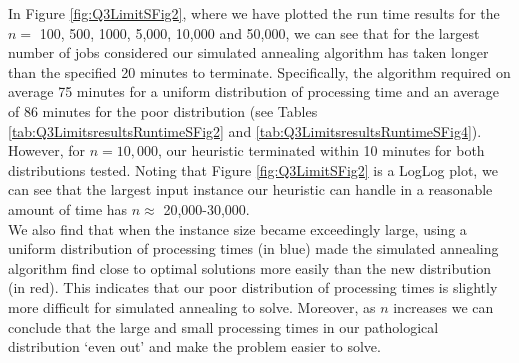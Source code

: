 \documentclass[12pt,a4paper,reqno]{article}
\begin{document}
In Figure \ref{fig:Q3LimitSFig2}, where we have plotted the run time results for the $n=$ 100, 500, 1000, 5,000, 10,000 and 50,000, we can see that for the largest number of jobs considered our simulated annealing algorithm has taken longer than the specified 20 minutes to terminate. Specifically, the algorithm required on average 75 minutes for a uniform distribution of processing time and an average of 86 minutes for the poor distribution (see Tables \ref{tab:Q3LimitsresultsRuntimeSFig2} and \ref{tab:Q3LimitsresultsRuntimeSFig4}). However, for $n=10,000$, our heuristic terminated within 10 minutes for both distributions tested. Noting that Figure \ref{fig:Q3LimitSFig2} is a LogLog plot, we can see that the largest input instance our heuristic can handle in a reasonable amount of time has $n\approx$ 20,000-30,000. \\

We also find that when the instance size became exceedingly large, using a uniform distribution of processing times (in blue) made the simulated annealing algorithm find close to optimal solutions more easily than the new distribution (in red). This indicates that our poor distribution of processing times is slightly more difficult for simulated annealing to solve. Moreover, as $n$ increases we can conclude that the large and small processing times in our pathological distribution `even out' and make the problem easier to solve.
\end{document}
